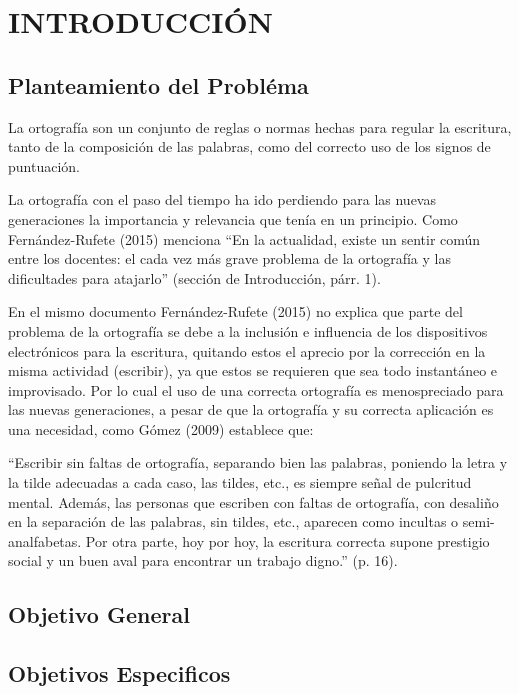 \chapter{INTRODUCCIÓN}
\section{Planteamiento del Probléma}
La ortografía son un conjunto de reglas o normas hechas para regular la escritura, tanto de la composición de las palabras, como del correcto uso de los signos de puntuación.

La ortografía con el paso del tiempo ha ido perdiendo para las nuevas generaciones la importancia y relevancia que tenía en un principio. Como Fernández-Rufete  (2015) menciona “En la actualidad, existe un sentir común entre los docentes: el cada vez más grave problema de la ortografía y las dificultades para atajarlo” (sección de Introducción, párr. 1).

En el mismo documento Fernández-Rufete (2015) no explica que parte del problema de la ortografía se debe a la inclusión e influencia de los dispositivos electrónicos para la escritura, quitando estos el aprecio por la corrección en la misma actividad (escribir), ya que estos se requieren que sea todo instantáneo e improvisado. Por lo cual el uso de una correcta ortografía es menospreciado para las nuevas generaciones, a pesar de que la ortografía y su correcta aplicación es una necesidad, como Gómez (2009) establece que:

\tab “Escribir sin faltas de ortografía, separando bien las palabras, poniendo la letra y la tilde adecuadas a cada caso, las tildes, etc., es siempre señal de pulcritud mental. Además, las personas que escriben con faltas de ortografía, con desaliño en la separación de las palabras, sin tildes, etc., aparecen como incultas o semi-analfabetas. Por otra parte, hoy por hoy, la escritura correcta supone prestigio social y un buen aval para encontrar un trabajo digno.” (p. 16).
\section{Objetivo General}

\section{Objetivos Especificos}